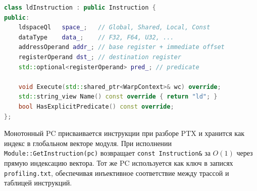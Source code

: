 \begin{lstlisting}[language=C++, caption={Пример: класс ldInstruction}]
class ldInstruction : public Instruction {
public:
    ldspaceQl   space_;   // Global, Shared, Local, Const
    dataType    data_;    // F32, F64, U32, ...
    addressOperand addr_; // base register + immediate offset
    registerOperand dst_; // destination register
    std::optional<registerOperand> pred_; // predicate

    void Execute(std::shared_ptr<WarpContext>& wc) override;
    std::string_view Name() const override { return "ld"; }
    bool HasExplicitPredicate() const override;
};
\end{lstlisting}

Монотонный PC присваивается инструкции при разборе PTX и хранится
как индекс в глобальном векторе модуля.
При исполнении \texttt{Module::GetInstruction(pc)} возвращает
\texttt{const Instruction\&} за $O(1)$ через прямую индексацию вектора.
Тот же PC используется как ключ в записях \texttt{profiling.txt},
обеспечивая инъективное соответствие между трассой и таблицей инструкций.


\newpage
